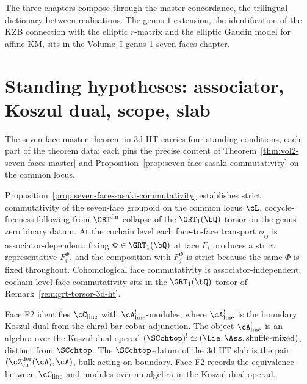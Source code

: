 The three chapters compose through the master concordance, the
trilingual dictionary between realisations. The genus-$1$
extension, the identification of the KZB connection with the
elliptic $r$-matrix and the elliptic Gaudin model for affine
KM, sits in the Volume~I genus-1 seven-faces chapter.

\section{Standing hypotheses: associator, Koszul dual, scope, slab}
\label{sec:dnp-master-hypotheses}

The seven-face master theorem in 3d HT carries four standing
conditions, each part of the theorem data; each pins the precise
content of Theorem~\ref{thm:vol2-seven-faces-master} and
Proposition~\ref{prop:seven-face-sasaki-commutativity} on the
common locus.

\begin{remark}
\label{rem:dnp-master-associator-dichotomy}
Proposition~\ref{prop:seven-face-sasaki-commutativity} establishes
strict commutativity of the seven-face groupoid on the common
locus $\cL$, cocycle-freeness following from
$\GRT^{\mathrm{fin}}$ collapse of the $\GRT_1(\bQ)$-torsor on the
genus-zero binary datum. At the cochain level each face-to-face
transport $\phi_{ij}$ is associator-dependent: fixing
$\Phi\in \GRT_1(\bQ)$ at face $F_i$ produces a strict
representative $F_i^{\Phi}$, and the composition with $F_j^{\Phi}$
is strict because the same $\Phi$ is fixed throughout. Cohomological
face commutativity is associator-independent; cochain-level face
commutativity sits in the $\GRT_1(\bQ)$-torsor of
Remark~\ref{rem:grt-torsor-3d-ht}.
\end{remark}

\begin{remark}
\label{rem:dnp-master-koszul-dual-operad}
Face F2 identifies $\cC_{\mathrm{line}}$ with
$\cA^{!}_{\mathrm{line}}$-modules, where $\cA^{!}_{\mathrm{line}}$
is the boundary Koszul dual from the chiral bar-cobar adjunction.
The object $\cA^{!}_{\mathrm{line}}$ is an algebra over the
Koszul-dual operad
$(\SCchtop)^{!} \simeq (\Lie, \Ass, \text{shuffle-mixed})$,
distinct from $\SCchtop$. The $\SCchtop$-datum of the 3d HT slab
is the pair $(\cZ^{\mathrm{der}}_{\mathrm{ch}}(\cA), \cA)$, bulk
acting on boundary. Face F2 records the equivalence between
$\cC_{\mathrm{line}}$ and modules over an algebra in the
Koszul-dual operad.
\end{remark}

